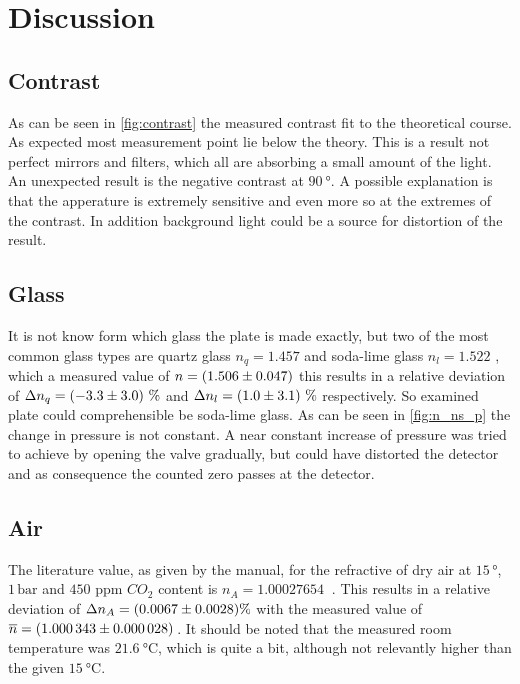 \section{Discussion}
\label{sec:Diskussion}

\subsection{Contrast}

As can be seen in \autoref{fig:contrast} the measured contrast fit to the theoretical course.
As expected most measurement point lie below the theory. 
This is a result not perfect mirrors and filters, which all are absorbing a small amount of the light.
An unexpected result is the negative contrast at $\SI{90}{\degree}$.
A possible explanation is that the apperature is extremely sensitive and even more so at the extremes of the contrast.
In addition background light could be a source for distortion of the result.

\subsection{Glass}

It is not know form which glass the plate is made exactly, but two of the most common glass types are quartz glass $n_{q} = 1.457$\cite{Malitson:65} and soda-lime glass $n_{l} = 1.522$ \cite{RUBIN1985275},
which a measured value of $n = \SI{1.506 \pm 0.047}{}$ this results in a relative deviation of $\Delta n_q = \SI{-3.3 \pm 3.0} \,\%$ and
$\Delta n_l = \SI{1.0 \pm 3.1}\,\%$ respectively. 
So examined plate could comprehensible be soda-lime glass.
As can be seen in \autoref{fig:n_ns_p} the change in pressure is not constant. 
A near constant increase of pressure was tried to achieve by opening the valve gradually, but could have distorted the detector and as consequence the counted zero passes at the detector.

\subsection{Air}

The literature value, as given by the manual, for the refractive of dry air at $15\, \unit{\degree}$, $1\, \unit{\bar}$ and $450$ ppm $CO_{2}$ content is $n_{A} = \SI{1.00027654}{}$ \cite{Ciddor:96}.
This results in a relative deviation of  $\Delta n_{A} = \SI{0.0067 \pm 0.0028}{} \%$ with the measured value of $\overline{n} = \SI{1.000343 \pm 0.000028}{}\,$. 
It should be noted that the measured room temperature was $\SI{21.6}{\celsius}$, which is quite a bit, although not relevantly higher than the given $\SI{15}{\celsius}$.